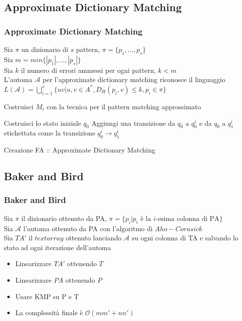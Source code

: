 \documentclass{beamer}
\newcommand{\bigO}{\ensuremath{\mathcal{O}}} %
\begin{document}
\subsection{Approximate Dictionary Matching}
\begin{frame}
\frametitle{Approximate Dictionary Matching}

\begin{definition}
	Sia $\pi$ un dizionario di $s$ pattern, $\pi = \{p_1,\dots,p_s\}$\\
	Sia $m = min\{|p_1|,\dots,|p_s|\}$\\
	Sia $k$ il numero di errori ammessi per ogni pattern, $k < m$ \\
	L'automa $\mathcal{A}$ per l'approximate dictionary matching riconosce il linguaggio $L(\mathcal{A}) =\bigcup_{i=1}^s \{ uv | u,v\in A^*, D_H(p_i,v) \leq k, p_i\in \pi \}$
\end{definition}

\begin{algorithm}[H]
\begin{algorithmic}[1]


\STATE Costruisci $M_i$ con la tecnica per il pattern matching approssimato

\ENDFOR
\STATE Costruisci lo stato iniziale $q_0$
\STATE Aggiungi una transizione da $q_0$ a $q_0^i$ e da $q_0$ a $q_1^i$ etichettata come la transizione $q_0^i \to q_1^i$
\ENDFOR

\end{algorithmic}
\caption{Creazione FA :: Approximate Dictionary Matching}
\end{algorithm}

\end{frame}



\subsection{Baker and Bird}
\begin{frame}
\frametitle{Baker and Bird}
\begin{definition}
	Sia $\pi$ il dizionario ottenuto da PA, $\pi= \{p_i | p_i \text{ è la } i \text{-esima colonna di PA}\}$\\
	Sia $\mathcal{A}$ l'automa ottenuto da PA con l'algoritmo di $Aho-Corasick$\\
	Sia $TA'$ il $text array$ ottenuto lanciando $\mathcal{A}$ su ogni colonna di TA e salvando lo stato ad ogni iterazione dell'automa
\end{definition}

\begin{itemize}
\item Linearizzare $TA'$ ottenendo $T$
\item Linearizzare $PA$ ottenendo $P$
\item Usare KMP su P e T
\item La complessità finale è  \bigO{$(mm' + nn')$} 
\end{itemize}


\end{frame}
\end{document}
